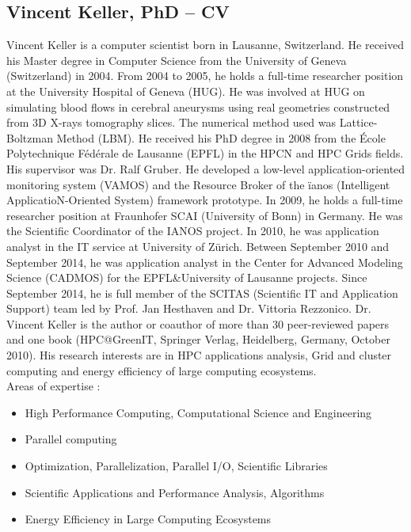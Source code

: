 \documentclass[11pt,a4paper]{article}
\begin{document}
\begin{appendices}
\section{Vincent Keller, PhD -- CV}

Vincent Keller is a computer scientist born in Lausanne, Switzerland. He received his Master degree in Computer Science from the University of Geneva (Switzerland) in 2004. From 2004 to 2005, he holds a full-time researcher position at the University Hospital of Geneva (HUG). He was involved at HUG on simulating blood flows in cerebral aneurysms using real geometries constructed from 3D X-rays tomography slices. The numerical method used was Lattice-Boltzman Method (LBM). He received his PhD degree in 2008 from the École Polytechnique Fédérale de Lausanne (EPFL) in the HPCN and HPC Grids fields. His supervisor was Dr. Ralf Gruber. He developed a low-level application-oriented monitoring system (VAMOS) and the Resource Broker of the ïanos (Intelligent ApplicatioN-Oriented System) framework prototype. In 2009, he holds a full-time researcher position at Fraunhofer SCAI (University of Bonn) in Germany. He was the Scientific Coordinator of the IANOS project. In 2010, he was application analyst in the IT service at University of Zürich. Between September 2010 and September 2014, he was application analyst in the Center for Advanced Modeling Science (CADMOS) for the EPFL\&University of Lausanne projects. Since September 2014, he is full member of the SCITAS (Scientific IT and Application Support) team led by Prof. Jan Hesthaven and Dr. Vittoria Rezzonico. Dr. Vincent Keller is the author or coauthor of more than 30 peer-reviewed papers and one book (HPC@GreenIT, Springer Verlag, Heidelberg, Germany, October 2010). His research interests are in HPC applications analysis, Grid and cluster computing and energy efficiency of large computing ecosystems.
\\

Areas of expertise :

\begin{itemize}
\item{ High Performance Computing, Computational Science and Engineering }
\item{ Parallel computing }
\item{ Optimization, Parallelization, Parallel I/O, Scientific Libraries }
\item{ Scientific Applications and Performance Analysis, Algorithms }
\item{ Energy Efficiency in Large Computing Ecosystems }
\end{itemize}


\end{appendices}
\end{document}
